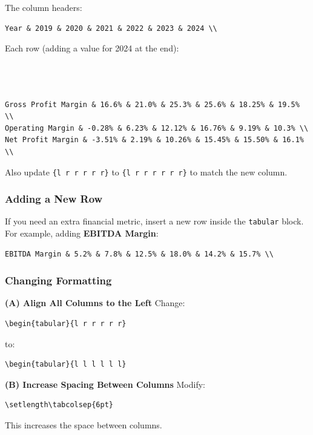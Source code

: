 \documentclass[a4paper,num-refs]{oup-contemporary}
\begin{document}
The column headers:\\
\begin{verbatim}
Year & 2019 & 2020 & 2021 & 2022 & 2023 & 2024 \\
\end{verbatim}
Each row (adding a value for 2024 at the end):\\
\begin{verbatim}



Gross Profit Margin & 16.6% & 21.0% & 25.3% & 25.6% & 18.25% & 19.5% \\
Operating Margin & -0.28% & 6.23% & 12.12% & 16.76% & 9.19% & 10.3% \\
Net Profit Margin & -3.51% & 2.19% & 10.26% & 15.45% & 15.50% & 16.1% \\

\end{verbatim}


Also update \texttt{\{l r r r r r\}} to \texttt{\{l r r r r r r\}} to match the new column.

\subsubsection{Adding a New Row}
If you need an extra financial metric, insert a new row inside the \texttt{tabular} block.  
For example, adding \textbf{EBITDA Margin}:

\begin{verbatim}
EBITDA Margin & 5.2% & 7.8% & 12.5% & 18.0% & 14.2% & 15.7% \\
\end{verbatim}

\subsubsection{Changing Formatting}
\textbf{(A) Align All Columns to the Left}  
Change:
\begin{verbatim}
\begin{tabular}{l r r r r r}
\end{verbatim}
to:
\begin{verbatim}
\begin{tabular}{l l l l l l}
\end{verbatim}

\textbf{(B) Increase Spacing Between Columns}  
Modify:
\begin{verbatim}
\setlength\tabcolsep{6pt}
\end{verbatim}
This increases the space between columns.
\end{document}

